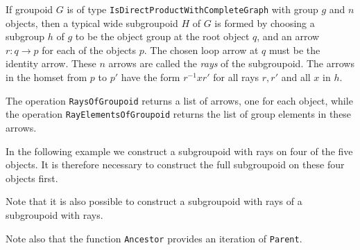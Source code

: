 \documentclass[a4paper,11pt]{report}
\begin{document}
{{{ If groupoid $G$ is of type \texttt{IsDirectProductWithCompleteGraph} with group $g$ and $n$ objects, then a typical wide subgroupoid $H$ of $G$ is formed by choosing a subgroup $h$ of $g$ to be the object group at the root object $q$, and an arrow $r : q \to p$ for each of the objects $p$. The chosen loop arrow at $q$ must be the identity arrow. These $n$ arrows are called the  \emph{rays} of the subgroupoid. The arrows in the homset from $p$ to $p'$ have the form $r^{-1}xr'$ for all rays $r,r'$ and all $x$ in $h$. 

 The operation \texttt{RaysOfGroupoid} returns a list of arrows, one for each object, while the operation \texttt{RayElementsOfGroupoid} returns the list of group elements in these arrows. 

 In the following example we construct a subgroupoid with rays on four of the
five objects. It is therefore necessary to construct the full subgroupoid on
these four objects first. 

 Note that it is also possible to construct a subgroupoid with rays of a
subgroupoid with rays. 

 Note also that the function  \texttt{Ancestor} provides an iteration of \texttt{Parent}. 

 }

 
\begin{Verbatim}[commandchars=!@|,fontsize=\small,frame=single,label=Example]
  

\end{Verbatim}}}
\end{document}

